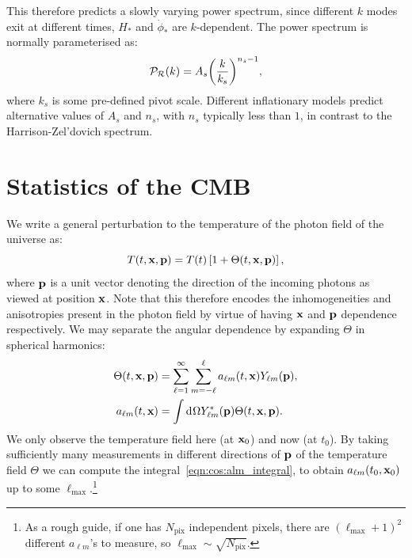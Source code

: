This therefore predicts a slowly varying power spectrum, since different \(k\) modes exit at different times, \(H_*\) and \(\dot{\phi}_*\) are \(k\)-dependent. The power spectrum is normally parameterised as:
\begin{equation}
  \mathcal{P}_{\mathcal{R}}(k) = A_s {\left( \frac{k}{k_s} \right)}^{n_s-1},
  \label{eqn:cos:lcdm_power}
\end{equation}
where \(k_s\) is some pre-defined pivot scale.
Different inflationary models predict alternative values of \(A_s\) and \(n_s\), with \(n_s\) typically less than \(1\), in contrast to the Harrison-Zel'dovich spectrum.








\section{Statistics of the CMB}
\label{cos:sec:CMB_stats}
We write a general perturbation to the temperature of the photon field of the universe as:
\begin{equation}
  T(t,\mathbf{x},\mathbf{p}) = T(t)\left[ 1+\Theta(t,\mathbf{x},\mathbf{p}) \right],
\end{equation}
where \(\mathbf{p}\) is a unit vector denoting the direction of the incoming photons as viewed at position \(\mathbf{x}\). Note that this therefore encodes the inhomogeneities and anisotropies present in the photon field by virtue of having \(\mathbf{x}\) and \(\mathbf{p}\) dependence respectively. We may separate the angular dependence by expanding \(\Theta\) in spherical harmonics:
\begin{align}
  \Theta(t,\mathbf{x},\mathbf{p}) &= \sum_{\ell=1}^{\infty}\sum_{m=-\ell}^{\ell}a_{\ell m}(t,\mathbf{x}) Y_{\ell m}(\mathbf{p}),\\
  a_{\ell m}(t,\mathbf{x}) &= \int \operatorname{d}^{}\!{\Omega} Y_{\ell m}^\ast(\mathbf{p}) \Theta(t,\mathbf{x},\mathbf{p}).
  \label{eqn:cos:alm_integral}
\end{align}
We only observe the temperature field here (at \(\mathbf{x}_0\)) and now (at \(t_0\)). By taking sufficiently many measurements in different directions of \(\mathbf{p}\) of the temperature field \(\Theta\) we can compute the integral~\eqref{eqn:cos:alm_integral}, to obtain \(a_{\ell m}(t_0,\mathbf{x}_0)\) up to some \(\ell_{\max{}}\).\footnote{As a rough guide, if one has \(N_\mathrm{pix}\) independent pixels, there are \({(\ell_{\max{}}+1)}^2\) different \(a_{\ell m}\)'s to measure, so \(\ell_{\max{}} \sim \sqrt{N_\mathrm{pix}}\).}

